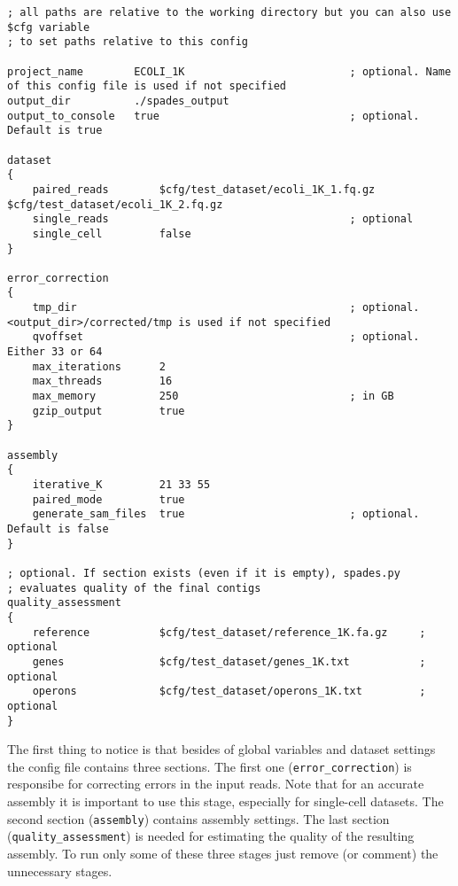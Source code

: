 \documentclass{article}
\def\spades{SPAdes}
\begin{document}
\begin{lstlisting}													
; all paths are relative to the working directory but you can also use $cfg variable 
; to set paths relative to this config

project_name        ECOLI_1K                          ; optional. Name of this config file is used if not specified
output_dir          ./spades_output
output_to_console   true                              ; optional. Default is true

dataset
{
    paired_reads        $cfg/test_dataset/ecoli_1K_1.fq.gz $cfg/test_dataset/ecoli_1K_2.fq.gz
    single_reads                                      ; optional
    single_cell         false
}

error_correction
{
    tmp_dir                                           ; optional. <output_dir>/corrected/tmp is used if not specified
    qvoffset                                          ; optional. Either 33 or 64
    max_iterations      2
    max_threads         16
    max_memory          250                           ; in GB
    gzip_output         true
}

assembly
{
    iterative_K         21 33 55
    paired_mode         true
    generate_sam_files  true                          ; optional. Default is false
}

; optional. If section exists (even if it is empty), spades.py 
; evaluates quality of the final contigs
quality_assessment      
{
    reference           $cfg/test_dataset/reference_1K.fa.gz     ; optional
    genes               $cfg/test_dataset/genes_1K.txt           ; optional
    operons             $cfg/test_dataset/operons_1K.txt         ; optional
}
\end{lstlisting}

The first thing to notice is that besides of global variables and dataset settings 
the config file contains three sections. The first one ({\tt error\_correction}) is responsibe for correcting errors in the input reads.
Note that for an accurate assembly it is important to use this stage, especially
for single-cell datasets.
The second section ({\tt assembly}) 
contains assembly settings.
The last section ({\tt quality\_assessment})
is needed for estimating the quality of the resulting assembly.
To run only some of these three stages just remove (or comment) the unnecessary stages.

\end{document}
